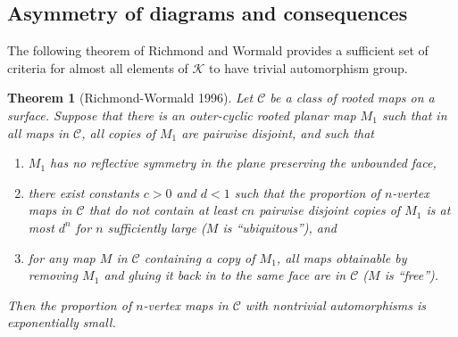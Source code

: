 \documentclass[amsmath,longbibliography,secnumarabic,floatfix,amssymb,nofootinbib,nobibnotes,letterpaper,11pt,tightenlines,notitlepage,showkeys,showlabels]{amsart}%
\newcommand{\FlatKnotDia}{\mathscr{K}}
\newtheorem{theorem}{Theorem}
\begin{document}
\subsection{Asymmetry of diagrams and consequences}
\label{sec:asymmetry}


The following theorem of Richmond and Wormald \cite{Richmond19951} provides a sufficient set of
criteria for almost all elements of $\FlatKnotDia$ to have trivial automorphism group.

\begin{theorem}[Richmond-Wormald 1996]
  Let $\mathscr C$ be a class of rooted maps on a surface. Suppose that there is an outer-cyclic
  rooted planar map $M_1$ such that in all maps in $\mathscr C$, all copies of $M_1$ are pairwise
  disjoint, and such that
  \begin{enumerate}
  \item $M_1$ has no reflective symmetry in the plane preserving the unbounded face,
  \item there exist constants $c > 0$ and $d < 1$ such that the proportion of $n$-vertex maps in
    $\mathscr C$ that do not contain at least $cn$ pairwise disjoint copies of $M_1$ is at most
    $d^n$ for $n$ sufficiently large ($M$ is ``ubiquitous''), and
  \item for any map $M$ in $\mathscr C$ containing a copy of $M_1$, all maps obtainable by removing
    $M_1$ and gluing it back in to the same face are in $\mathscr C$ ($M$ is ``free'').
  \end{enumerate}
  Then the proportion of $n$-vertex maps in $\mathscr C$ with nontrivial automorphisms is
  exponentially small.
\end{theorem}
\end{document}
